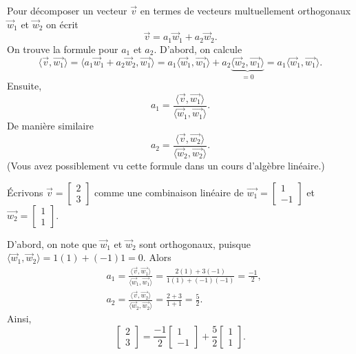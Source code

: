 Pour décomposer un vecteur $\vec{v}$ en termes de vecteurs multuellement orthogonaux  $\vec{w}_1$ et $\vec{w}_2$ on écrit
\begin{equation*}
\vec{v} = a_1 \vec{w}_1  + a_2 \vec{w}_2 .
\end{equation*}
On trouve la formule pour $a_1$ et $a_2$. D'abord, on calcule 
\begin{equation*}
\langle \vec{v} , \vec{w_1} \rangle
=
\langle a_1 \vec{w}_1  + a_2 \vec{w}_2 , \vec{w_1} \rangle
=
a_1 \langle \vec{w}_1 , \vec{w_1} \rangle
+
a_2 \underbrace{\langle \vec{w}_2 , \vec{w_1} \rangle}_{=0}
=
a_1 \langle \vec{w}_1 , \vec{w_1} \rangle .
\end{equation*}
Ensuite,
\begin{equation*}
a_1 = 
\frac{\langle \vec{v} , \vec{w_1} \rangle}{
\langle \vec{w}_1 , \vec{w_1} \rangle} .
\end{equation*}
De manière similaire
\begin{equation*}
a_2 = 
\frac{\langle \vec{v} , \vec{w_2} \rangle}{
\langle \vec{w}_2 , \vec{w_2} \rangle} .
\end{equation*}
(Vous avez possiblement vu cette formule dans un cours d'algèbre linéaire.)

\begin{example}
Écrivons 
$\vec{v} = \left[ \begin{smallmatrix} 2 \\ 3 \end{smallmatrix} \right]$
comme une combinaison linéaire de 
$\vec{w_1} = \left[ \begin{smallmatrix} 1 \\ -1 \end{smallmatrix} \right]$
et
$\vec{w_2} = \left[ \begin{smallmatrix} 1 \\ 1 \end{smallmatrix} \right]$.

D'abord, on note que $\vec{w}_1$ et $\vec{w}_2$ sont orthogonaux, puisque 
 $\langle \vec{w}_1 , \vec{w}_2 \rangle = 1(1) + (-1)1 = 0$.
Alors
\begin{align*}
& a_1 = 
\frac{\langle \vec{v} , \vec{w_1} \rangle}{
\langle \vec{w}_1 , \vec{w_1} \rangle}
=
\frac{2(1) + 3(-1)}{1(1) + (-1)(-1)} = \frac{-1}{2} ,
\\
& a_2 = 
\frac{\langle \vec{v} , \vec{w_2} \rangle}{
\langle \vec{w}_2 , \vec{w_2} \rangle}
=
\frac{2 + 3}{1 + 1} = \frac{5}{2} .
\end{align*}
Ainsi,
\begin{equation*}
\begin{bmatrix} 2 \\ 3 \end{bmatrix}
=
\frac{-1}{2}
\begin{bmatrix} 1 \\ -1 \end{bmatrix}
+
\frac{5}{2}
\begin{bmatrix} 1 \\ 1 \end{bmatrix} .
\end{equation*}
\end{example}

